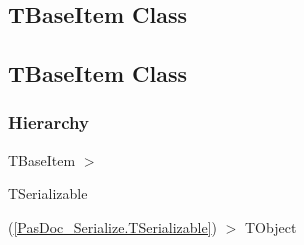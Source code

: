 \documentclass{report}
\begin{document}
\subsection*{\large{\textbf{TBaseItem Class}}\normalsize\hspace{1ex}\hrulefill}
\else
\subsection*{TBaseItem Class}
\fi
\label{PasDoc_Items.TBaseItem}
\subsubsection*{\large{\textbf{Hierarchy}}\normalsize\hspace{1ex}\hfill}
TBaseItem {$>$} \begin{ttfamily}TSerializable\end{ttfamily}(\ref{PasDoc_Serialize.TSerializable}) {$>$} 
TObject
\end{document}
